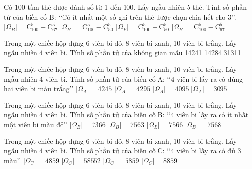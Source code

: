 \begin{ex}
Có 100 tấm thẻ được đánh số từ 1 đến 100. Lấy ngẫu nhiên 5 thẻ. Tính số phần tử của biến cố B: \lq\lq   Có ít nhất một số ghi trên thẻ được chọn chia hết cho 3\rq\rq .
\choice
{$|\Omega_B|=\mathrm{C}_{100}^5+\mathrm{C}_{67}^5$}
{$|\Omega_B|=\mathrm{C}_{100}^5-\mathrm{C}_{50}^5$}
{$|\Omega_B|=\mathrm{C}_{100}^5+\mathrm{C}_{50}^5$}
{\True $|\Omega_B|=\mathrm{C}_{100}^5-\mathrm{C}_{67}^5$}
\end{ex}
\begin{ex}
Trong một chiếc hộp đựng 6 viên bi đỏ, 8 viên bi xanh, 10 viên bi trắng. Lấy ngẫu nhiên 4 viên bi. Tính số phần tử của không gian mẫu
\choice
{}
{14241}
{14284}
{31311}
\end{ex}
\begin{ex}
Trong một chiếc hộp đựng 6 viên bi đỏ, 8 viên bi xanh, 10 viên bi trắng. Lấy ngẫu nhiên 4 viên bi. Tính số phần tử của biến cố A: \lq\lq   4 viên bi lấy ra có đúng hai viên bi màu trắng\rq\rq 
\choice
{$|\Omega_A|=4245$}
{$|\Omega_A|=4295$}
{\True $|\Omega_A|=4095$}
{$|\Omega_A|=3095$}
\end{ex}
\begin{ex}
Trong một chiếc hộp đựng 6 viên bi đỏ, 8 viên bi xanh, 10 viên bi trắng. Lấy ngẫu nhiên 4 viên bi. Tính số phần tử của biến cố B: \lq\lq   4 viên bi lấy ra có ít nhất một viên bi màu đỏ\rq\rq 
\choice
{$|\Omega_B|=7366$}
{$|\Omega_B|=7563$}
{\True $|\Omega_B|=7566$}
{$|\Omega_B|=7568$}
\end{ex}
\begin{ex}
Trong một chiếc hộp đựng 6 viên bi đỏ, 8 viên bi xanh, 10 viên bi trắng. Lấy ngẫu nhiên 4 viên bi. Tính số phần tử của biến cố C: \lq\lq   4 viên bi lấy ra có đủ 3 màu\rq\rq 
\choice
{$|\Omega_C|=4859$}
{$|\Omega_C|=58552$}
{\True $|\Omega_C|=5859$}
{$|\Omega_C|=8859$}
\end{ex}
